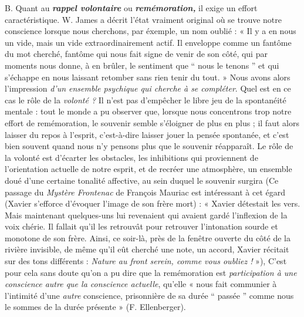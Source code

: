 B. Quant au \textbf{\textit {rappel volontaire}} ou \textbf{\textit {remémoration,}} il exige un effort
caractéristique. W. James a décrit l’état vraiment original où se
trouve notre conscience lorsque nous cherchons, par éxemple, un
nom oublié : « Il y a en nous un vide, mais un vide extraordinairement
actif. Il enveloppe comme un fantôme du mot cherché, fantôme qui
nous fait signe de venir de son côté, qui par moments nous donne, à en
brûler, le sentiment que “ nous le tenons ” et qui s’échappe en nous
laissant retomber sans rien tenir du tout. » Nous avons alors l’impression
{\it d’un ensemble psychique qui cherche à se compléter}. Quel est en ce
cas le rôle de la {\it volonté ?} Il n’est pas d'empêcher le libre jeu de la
spontanéité mentale : tout le monde a pu observer que, lorsque nous
concentrons trop notre effort de remémoration, le souvenir semble
s'éloigner de plus en plus ; il faut alors laisser du repos à l'esprit,
c’est-à-dire laisser jouer la pensée spontanée, et c’est bien souvent
quand nous n’y pensons plus que le souvenir réapparaît. Le rôle de la
volonté est d’écarter les obstacles, les inhibitions qui proviennent de
l'orientation actuelle de notre esprit, et de {\it }recréer une atmosphère,
un ensemble doué d’une certaine tonalité affective, au sein duquel
le souvenir surgira
{\scriptsize (Ce passage du {\it Mystère Frontenac} de François Mauriac est intéressant à cet égard
(Xavier s'efforce d'évoquer l'image de son frère mort) : « Xavier détestait les vers.
Mais maintenant quelques-uns lui revenaient qui avaient gardé l'inflexion de la voix
chérie. Il fallait qu'il les retrouvât pour retrouver l'intonation sourde et monotone de
son frère. Ainsi, ce soir-là, près de la fenêtre ouverte du côté de la rivière invisible, de
même qu'il eût cherché une note, un accord, Xavier récitait sur des tons différents :
{\it Nature au front serein, comme vous oubliez !} »)},
C’est pour cela sans doute qu’on a pu dire que la
remémoration est {\it participation à une conscience autre que la conscience
actuelle}, qu’elle « nous fait communier à l’intimité d’une {\it autre} conscience,
prisonnière de sa durée “ passée ” comme nous le sommes de
la durée présente » (F. Ellenberger).

